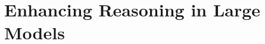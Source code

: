 \setcounter{chapter}{22}

\hypertarget{enhancing-reasoning-in-large-models}{%
\chapter{Enhancing Reasoning in Large Models}\label{enhancing-reasoning-in-large-models}}
